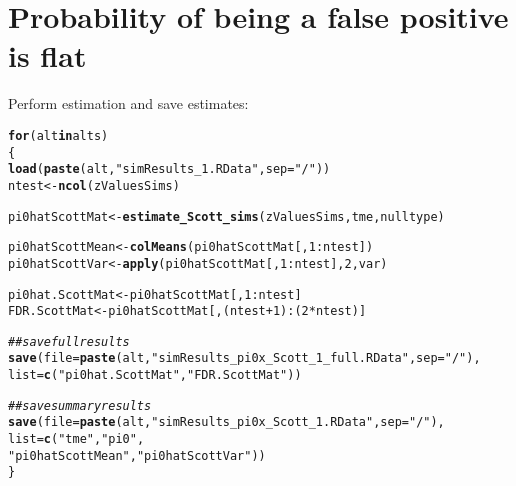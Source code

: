 \documentclass{article}\usepackage[]{graphicx}\usepackage[]{color}
\makeatletter
\newcommand{\hlnum}[1]{\textcolor[rgb]{0.686,0.059,0.569}{#1}}%
\newcommand{\hlstr}[1]{\textcolor[rgb]{0.192,0.494,0.8}{#1}}%
\newcommand{\hlcom}[1]{\textcolor[rgb]{0.678,0.584,0.686}{\textit{#1}}}%
\newcommand{\hlopt}[1]{\textcolor[rgb]{0,0,0}{#1}}%
\newcommand{\hlstd}[1]{\textcolor[rgb]{0.345,0.345,0.345}{#1}}%
\newcommand{\hlkwa}[1]{\textcolor[rgb]{0.161,0.373,0.58}{\textbf{#1}}}%
\newcommand{\hlkwb}[1]{\textcolor[rgb]{0.69,0.353,0.396}{#1}}%
\newcommand{\hlkwc}[1]{\textcolor[rgb]{0.333,0.667,0.333}{#1}}%
\newcommand{\hlkwd}[1]{\textcolor[rgb]{0.737,0.353,0.396}{\textbf{#1}}}%
\newenvironment{kframe}{%
 \def\at@end@of@kframe{}%
 \ifinner\ifhmode%
  \def\at@end@of@kframe{\end{minipage}}%
  \begin{minipage}{\columnwidth}%
 \fi\fi%
 \def\FrameCommand##1{\hskip\@totalleftmargin \hskip-\fboxsep
 \colorbox{shadecolor}{##1}\hskip-\fboxsep
     \hskip-\linewidth \hskip-\@totalleftmargin \hskip\columnwidth}%
 \MakeFramed {\advance\hsize-\width
   \@totalleftmargin\z@ \linewidth\hsize
   \@setminipage}}%
 {\par\unskip\endMakeFramed%
 \at@end@of@kframe}
\newenvironment{knitrout}{}{} %
\makeatother
\begin{document}
\section{Probability of being a false positive is flat}

Perform estimation and save estimates:

\begin{knitrout}
\color{fgcolor}\begin{kframe}
\begin{alltt}
\hlkwa{for}\hlstd{(alt} \hlkwa{in} \hlstd{alts)}
\hlstd{\{}
  \hlkwd{load}\hlstd{(}\hlkwd{paste}\hlstd{(alt,}\hlstr{"simResults_1.RData"}\hlstd{,}\hlkwc{sep}\hlstd{=}\hlstr{"/"}\hlstd{))}
  \hlstd{ntest} \hlkwb{<-} \hlkwd{ncol}\hlstd{(zValuesSims)}

  \hlstd{pi0hatScottMat} \hlkwb{<-} \hlkwd{estimate_Scott_sims}\hlstd{(zValuesSims, tme, nulltype)}

  \hlstd{pi0hatScottMean} \hlkwb{<-} \hlkwd{colMeans}\hlstd{(pi0hatScottMat[,}\hlnum{1}\hlopt{:}\hlstd{ntest])}
  \hlstd{pi0hatScottVar} \hlkwb{<-} \hlkwd{apply}\hlstd{(pi0hatScottMat[,}\hlnum{1}\hlopt{:}\hlstd{ntest],}\hlnum{2}\hlstd{,var)}

  \hlstd{pi0hat.ScottMat} \hlkwb{<-} \hlstd{pi0hatScottMat[,}\hlnum{1}\hlopt{:}\hlstd{ntest]}
  \hlstd{FDR.ScottMat} \hlkwb{<-} \hlstd{pi0hatScottMat[,(ntest}\hlopt{+}\hlnum{1}\hlstd{)}\hlopt{:}\hlstd{(}\hlnum{2}\hlopt{*}\hlstd{ntest)]}

  \hlcom{##save full results}
  \hlkwd{save}\hlstd{(}\hlkwc{file}\hlstd{=}\hlkwd{paste}\hlstd{(alt,}\hlstr{"simResults_pi0x_Scott_1_full.RData"}\hlstd{,}\hlkwc{sep}\hlstd{=}\hlstr{"/"}\hlstd{),}
       \hlkwc{list}\hlstd{=}\hlkwd{c}\hlstd{(}\hlstr{"pi0hat.ScottMat"}\hlstd{,} \hlstr{"FDR.ScottMat"}\hlstd{))}

  \hlcom{##save summary results}
  \hlkwd{save}\hlstd{(}\hlkwc{file}\hlstd{=}\hlkwd{paste}\hlstd{(alt,}\hlstr{"simResults_pi0x_Scott_1.RData"}\hlstd{,}\hlkwc{sep}\hlstd{=}\hlstr{"/"}\hlstd{),}
       \hlkwc{list}\hlstd{=}\hlkwd{c}\hlstd{(}\hlstr{"tme"}\hlstd{,} \hlstr{"pi0"}\hlstd{,}
            \hlstr{"pi0hatScottMean"}\hlstd{,}\hlstr{"pi0hatScottVar"}\hlstd{))}
\hlstd{\}}
\end{alltt}


{\ttfamily\noindent\color{warningcolor}{\#\# Warning in apply(as.matrix(pi0hatScottMat), 2, as.numeric): NAs introduced by coercion}}

{\ttfamily\noindent\color{warningcolor}{\#\# Warning in apply(as.matrix(pi0hatScottMat), 2, as.numeric): NAs introduced by coercion}}


\end{kframe}
\end{knitrout}
\end{document}

